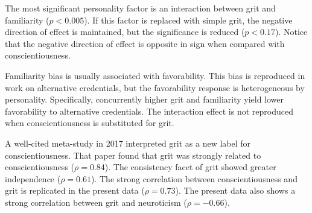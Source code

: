 \documentclass[review]{elsarticle}
\begin{document}
The most significant personality factor is an interaction between grit and familiarity ($p<0.005$).
If this factor is replaced with simple grit,
the negative direction of effect is maintained, but the significance is reduced ($p<0.17$).
Notice that the negative direction of effect is opposite in sign when compared with conscientiousness.

Familiarity bias is usually associated with favorability.
This bias is reproduced in work on alternative credentials,
but the favorability response is heterogeneous by personality.
Specifically, concurrently higher grit and familiarity yield lower favorability to alternative credentials.
The interaction effect is not reproduced when conscientiousness is substituted for grit.

A well-cited meta-study in 2017 interpreted grit as a new label for conscientiousness\cite{schmidt2018same}.
That paper found that grit was strongly related to conscientiousness ($\rho = 0.84$).
The consistency facet of grit showed greater independence ($\rho = 0.61$).
The strong correlation between conscientiousness and grit is replicated in the present data ($\rho = 0.73$).
The present data also shows a strong correlation between grit and neuroticism ($\rho = -0.66$).

\end{document}
